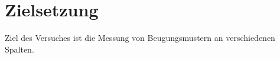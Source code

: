 \section{Zielsetzung}
\label{sec:Ziel}
Ziel des Versuches ist die Messung von Beugungsmustern an verschiedenen Spalten.

